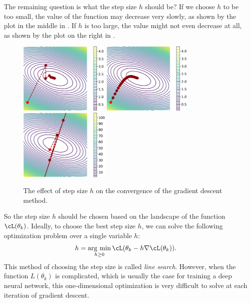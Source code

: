 \documentclass[../../book-main.tex]{subfiles}
\begin{document}
The remaining question is what the step size $h$ should be? If we choose $h$ to be too small, the value of the function may decrease very slowly, as shown by the plot in the middle in . If $h$ is too large, the value might not even decrease at all, as shown by the plot on the right in .

\begin{figure}[h]
    \centering
    \includegraphics[height=3.5cm]{chapters/appendixA/figs/GD-1.png}
    \hspace{3mm}
    \includegraphics[height=3.5cm]{chapters/appendixA/figs/GD-2.png}
    \hspace{3mm}
    \includegraphics[height=3.5cm]{chapters/appendixA/figs/GD-3.png}
    \caption{The effect of step size $h$ on the convergence of the gradient descent method.}
    \label{fig:step-size}
\end{figure}

So the step size $h$ should be chosen based on the landscape of the function $\cL(\theta_k)$. Ideally, to choose the best step size $h$, we can solve the following optimization problem over a single variable $h$:
\begin{equation}
    h = \argmin_{h\geq 0} \cL(\theta_k - h\nabla \cL(\theta_k)).
\end{equation}
This method of choosing the step size is called \textit{line search}. However, when the function $L(\theta_k)$ is complicated, which is usually the case for training a deep neural network, this one-dimensional optimization is very difficult to solve at each iteration of gradient descent. 
\end{document}
